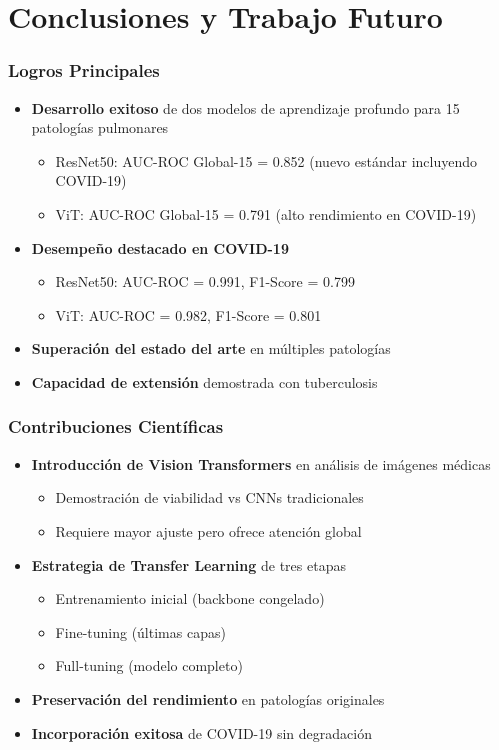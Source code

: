 
\section{Conclusiones y Trabajo Futuro}

\begin{frame}
\frametitle{Logros Principales}
\begin{itemize}
    \item \textbf{Desarrollo exitoso} de dos modelos de aprendizaje profundo para 15 patologías pulmonares
    \begin{itemize}
        \item ResNet50: AUC-ROC Global-15 = 0.852 (nuevo estándar incluyendo COVID-19)
        \item ViT: AUC-ROC Global-15 = 0.791 (alto rendimiento en COVID-19)
    \end{itemize}
    \item \textbf{Desempeño destacado en COVID-19}
    \begin{itemize}
        \item ResNet50: AUC-ROC = 0.991, F1-Score = 0.799
        \item ViT: AUC-ROC = 0.982, F1-Score = 0.801
    \end{itemize}
    \item \textbf{Superación del estado del arte} en múltiples patologías
    \item \textbf{Capacidad de extensión} demostrada con tuberculosis
\end{itemize}
\end{frame}

\begin{frame}
\frametitle{Contribuciones Científicas}
\begin{itemize}
    \item \textbf{Introducción de Vision Transformers} en análisis de imágenes médicas
    \begin{itemize}
        \item Demostración de viabilidad vs CNNs tradicionales
        \item Requiere mayor ajuste pero ofrece atención global
    \end{itemize}
    \item \textbf{Estrategia de Transfer Learning} de tres etapas
    \begin{itemize}
        \item Entrenamiento inicial (backbone congelado)
        \item Fine-tuning (últimas capas)
        \item Full-tuning (modelo completo)
    \end{itemize}
    \item \textbf{Preservación del rendimiento} en patologías originales
    \item \textbf{Incorporación exitosa} de COVID-19 sin degradación
\end{itemize}
\end{frame}

